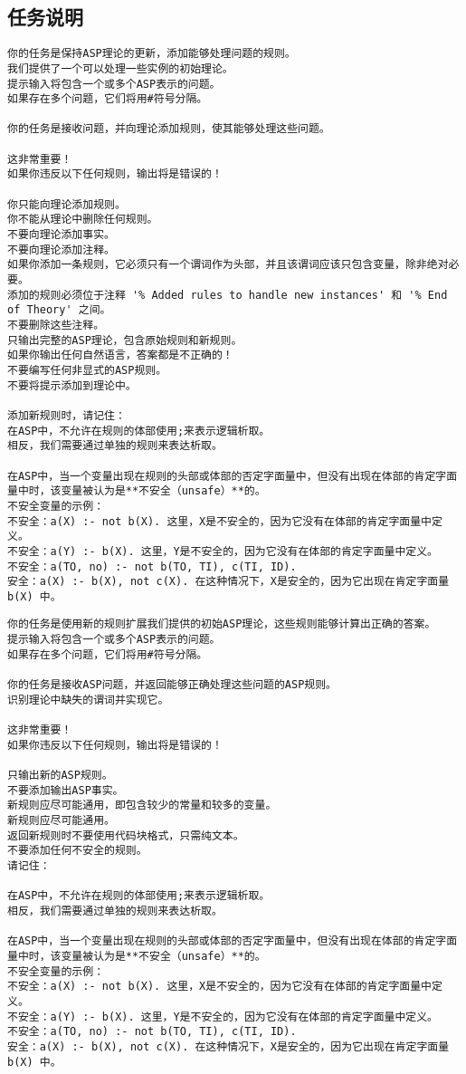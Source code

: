 \subsection{任务说明}
\begin{lstlisting}
你的任务是保持ASP理论的更新，添加能够处理问题的规则。
我们提供了一个可以处理一些实例的初始理论。
提示输入将包含一个或多个ASP表示的问题。
如果存在多个问题，它们将用#符号分隔。

你的任务是接收问题，并向理论添加规则，使其能够处理这些问题。

这非常重要！
如果你违反以下任何规则，输出将是错误的！

你只能向理论添加规则。
你不能从理论中删除任何规则。
不要向理论添加事实。
不要向理论添加注释。
如果你添加一条规则，它必须只有一个谓词作为头部，并且该谓词应该只包含变量，除非绝对必要。
添加的规则必须位于注释 '% Added rules to handle new instances' 和 '% End of Theory' 之间。
不要删除这些注释。
只输出完整的ASP理论，包含原始规则和新规则。
如果你输出任何自然语言，答案都是不正确的！
不要编写任何非显式的ASP规则。
不要将提示添加到理论中。

添加新规则时，请记住：
在ASP中，不允许在规则的体部使用;来表示逻辑析取。
相反，我们需要通过单独的规则来表达析取。

在ASP中，当一个变量出现在规则的头部或体部的否定字面量中，但没有出现在体部的肯定字面量中时，该变量被认为是**不安全（unsafe）**的。
不安全变量的示例：
不安全：a(X) :- not b(X). 这里，X是不安全的，因为它没有在体部的肯定字面量中定义。
不安全：a(Y) :- b(X). 这里，Y是不安全的，因为它没有在体部的肯定字面量中定义。
不安全：a(TO, no) :- not b(TO, TI), c(TI, ID).
安全：a(X) :- b(X), not c(X). 在这种情况下，X是安全的，因为它出现在肯定字面量 b(X) 中。
\end{lstlisting}

\begin{lstlisting}
你的任务是使用新的规则扩展我们提供的初始ASP理论，这些规则能够计算出正确的答案。
提示输入将包含一个或多个ASP表示的问题。
如果存在多个问题，它们将用#符号分隔。

你的任务是接收ASP问题，并返回能够正确处理这些问题的ASP规则。
识别理论中缺失的谓词并实现它。

这非常重要！
如果你违反以下任何规则，输出将是错误的！

只输出新的ASP规则。
不要添加输出ASP事实。
新规则应尽可能通用，即包含较少的常量和较多的变量。
新规则应尽可能通用。
返回新规则时不要使用代码块格式，只需纯文本。
不要添加任何不安全的规则。
请记住：

在ASP中，不允许在规则的体部使用;来表示逻辑析取。
相反，我们需要通过单独的规则来表达析取。

在ASP中，当一个变量出现在规则的头部或体部的否定字面量中，但没有出现在体部的肯定字面量中时，该变量被认为是**不安全（unsafe）**的。
不安全变量的示例：
不安全：a(X) :- not b(X). 这里，X是不安全的，因为它没有在体部的肯定字面量中定义。
不安全：a(Y) :- b(X). 这里，Y是不安全的，因为它没有在体部的肯定字面量中定义。
不安全：a(TO, no) :- not b(TO, TI), c(TI, ID).
安全：a(X) :- b(X), not c(X). 在这种情况下，X是安全的，因为它出现在肯定字面量 b(X) 中。
\end{lstlisting}

